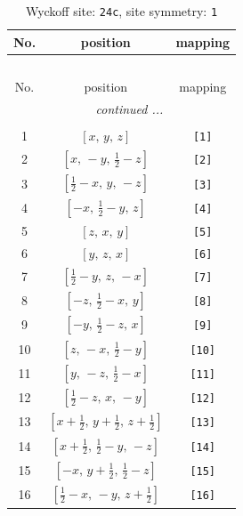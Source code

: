 \documentclass[fleqn,8pt]{jsarticle}
\begin{document}
\begin{longtable}{ccc}
\caption{Wyckoff site: {\tt 24c}, site symmetry: {\tt 1}}
 \\
 \hline \hline
No. & position & mapping \\ \hline \endfirsthead

\multicolumn{2}{l}{\tablename\ \thetable{}} \\
 \hline \hline
No. & position & mapping \\ \hline \endhead

 \hline \hline
\multicolumn{2}{r}{\footnotesize\it continued ...} \\ \endfoot

 \hline \hline
\multicolumn{2}{r}{} \\ \endlastfoot

1 & $\left[ x,\, y,\, z \right]$ & {\tt [1]} \\ \hline
2 & $\left[ x,\, - y,\, \frac{1}{2} - z \right]$ & {\tt [2]} \\ \hline
3 & $\left[ \frac{1}{2} - x,\, y,\, - z \right]$ & {\tt [3]} \\ \hline
4 & $\left[ - x,\, \frac{1}{2} - y,\, z \right]$ & {\tt [4]} \\ \hline
5 & $\left[ z,\, x,\, y \right]$ & {\tt [5]} \\ \hline
6 & $\left[ y,\, z,\, x \right]$ & {\tt [6]} \\ \hline
7 & $\left[ \frac{1}{2} - y,\, z,\, - x \right]$ & {\tt [7]} \\ \hline
8 & $\left[ - z,\, \frac{1}{2} - x,\, y \right]$ & {\tt [8]} \\ \hline
9 & $\left[ - y,\, \frac{1}{2} - z,\, x \right]$ & {\tt [9]} \\ \hline
10 & $\left[ z,\, - x,\, \frac{1}{2} - y \right]$ & {\tt [10]} \\ \hline
11 & $\left[ y,\, - z,\, \frac{1}{2} - x \right]$ & {\tt [11]} \\ \hline
12 & $\left[ \frac{1}{2} - z,\, x,\, - y \right]$ & {\tt [12]} \\ \hline
13 & $\left[ x + \frac{1}{2},\, y + \frac{1}{2},\, z + \frac{1}{2} \right]$ & {\tt [13]} \\ \hline
14 & $\left[ x + \frac{1}{2},\, \frac{1}{2} - y,\, - z \right]$ & {\tt [14]} \\ \hline
15 & $\left[ - x,\, y + \frac{1}{2},\, \frac{1}{2} - z \right]$ & {\tt [15]} \\ \hline
16 & $\left[ \frac{1}{2} - x,\, - y,\, z + \frac{1}{2} \right]$ & {\tt [16]} \\ \hline

\end{longtable}
\end{document}
